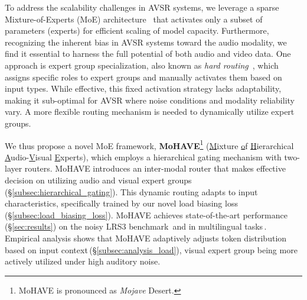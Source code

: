 To address the scalability challenges in AVSR systems, we leverage a sparse Mixture-of-Experts (MoE) architecture~\cite{shazeer2017outrageously, fedus2022switch} that activates only a subset of parameters (\ie experts) for efficient scaling of model capacity. Furthermore, recognizing the inherent bias in AVSR systems toward the audio modality, we find it essential to harness the full potential of both audio and video data. One approach is expert group specialization, also known as \textit{hard routing}~\cite{zhu2022uni, li2023pace, lee2025moai}, which assigns specific roles to expert groups and manually activates them based on input types. While effective, this fixed activation strategy lacks adaptability, making it sub-optimal for AVSR where noise conditions and modality reliability vary. A more flexible routing mechanism is needed to dynamically utilize expert groups.

We thus propose a novel MoE framework, \textbf{MoHAVE}\setcounter{footnote}{1}\footnote{MoHAVE is pronounced as \textit{Mojave} Desert.} (\underline{M}ixture \underline{o}f \underline{H}ierarchical \underline{A}udio-\underline{V}isual \underline{E}xperts), which employs a hierarchical gating mechanism with two-layer routers.
MoHAVE introduces an inter-modal router that makes effective decision on utilizing audio and visual expert groups (\S\ref{subsec:hierarchical_gating}). This dynamic routing adapts to input characteristics, specifically trained by our novel load biasing loss (\S\ref{subsec:load_biasing_loss}).
MoHAVE achieves state-of-the-art performance (\S\ref{sec:results}) on the noisy LRS3 benchmark\,\cite{afouras2018lrs3} and in multilingual tasks\,\cite{anwar2023muavic}. 
Empirical analysis shows that MoHAVE adaptively adjusts token distribution based on input context\,(\S\ref{subsec:analysis_load}), \eg visual expert group being more actively utilized under high auditory noise.

